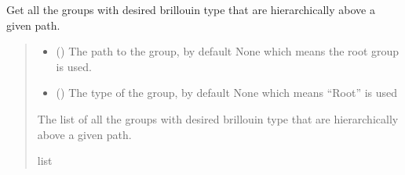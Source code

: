 \documentclass[letterpaper,10pt,english]{sphinxmanual}
\begin{document}
\begin{fulllineitems}
\begin{fulllineitems}
\label{\detokenize{_autosummary/HDF5_BLS.wrapper:HDF5_BLS.wrapper.Wrapper.get_special_groups_hierarchy}}
\pysigstartsignatures
\pysiglinewithargsret
{}
{\sphinxparamcomma {}}
{}
\pysigstopsignatures
\sphinxAtStartPar
Get all the groups with desired brillouin type that are hierarchically above a given path.
\begin{quote}\begin{description}
\begin{itemize}
\item {} 
\sphinxAtStartPar
{} (\sphinxstyleliteralemphasis{\sphinxupquote{, }}) \textendash{} The path to the group, by default None which means the root group is used.

\item {} 
\sphinxAtStartPar
{} (\sphinxstyleliteralemphasis{\sphinxupquote{, }}) \textendash{} The type of the group, by default None which means “Root” is used

\end{itemize}

\sphinxAtStartPar
The list of all the groups with desired brillouin type that are hierarchically above a given path.

\sphinxAtStartPar
list

\end{description}\end{quote}

\end{fulllineitems}



\end{fulllineitems}
\end{document}
